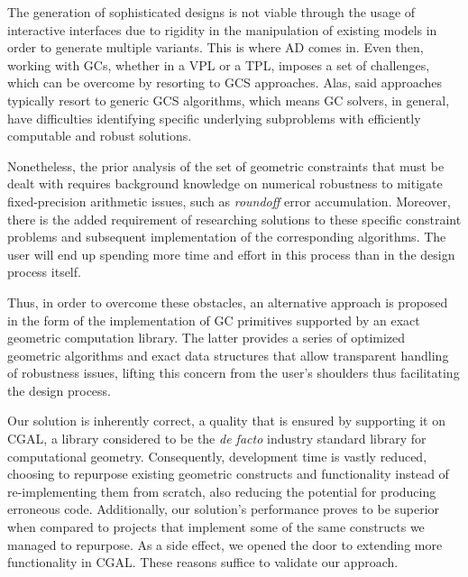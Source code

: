 %
\label{chap:conclusion}
\cleardoublepage{}

\noindent The generation of sophisticated designs is not viable through the
usage of interactive interfaces due to rigidity in the manipulation of existing
models in order to generate multiple variants.  This is where \ac{AD} comes in.
Even then, working with \acp{GC}, whether in a \ac{VPL} or a \ac{TPL}, imposes a
set of challenges, which can be overcome by resorting to \ac{GCS} approaches.
Alas, said approaches typically resort to generic \acs{GCS} algorithms, which
means \ac{GC} solvers, in general, have difficulties identifying specific
underlying subproblems with efficiently computable and robust solutions.

Nonetheless, the prior analysis of the set of geometric constraints that must be
dealt with requires background knowledge on numerical robustness to
mitigate fixed-precision arithmetic issues, such as \textit{roundoff} error
accumulation.  Moreover, there is the added requirement of researching solutions
to these specific constraint problems and subsequent implementation of the
corresponding algorithms.  The user will end up spending more time and effort in
this process than in the design process itself.

Thus, in order to overcome these obstacles, an alternative approach is proposed
in the form of the implementation of \ac{GC} primitives supported by an exact
geometric computation library.  The latter provides a series of optimized
geometric algorithms and exact data structures that allow transparent handling
of robustness issues, lifting this concern from the user's shoulders thus
facilitating the design process.

Our solution is inherently correct, a quality that is ensured by supporting it
on \ac{CGAL}, a library considered to be the \textit{de facto} industry standard
library for computational geometry.  Consequently, development time is vastly
reduced, choosing to repurpose existing geometric constructs and functionality
instead of re-implementing them from scratch, also reducing the potential for
producing erroneous code.  Additionally, our solution's performance proves to be
superior when compared to projects that implement some of the same constructs we
managed to repurpose.  As a side effect, we opened the door to extending more
functionality in \ac{CGAL}.  These reasons suffice to validate our approach.

